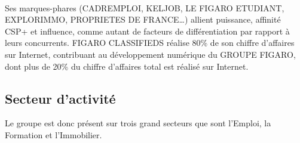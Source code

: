 \paragraph{}
Ses marques-phares (CADREMPLOI, KELJOB, LE FIGARO ETUDIANT, EXPLORIMMO, PROPRIETES DE FRANCE…) allient puissance, affinité CSP+ et influence, comme autant de facteurs de différentiation par rapport à leurs concurrents.
FIGARO CLASSIFIEDS réalise 80\% de son chiffre d’affaires sur Internet, contribuant au développement numérique du GROUPE FIGARO, dont plus de 20\% du chiffre d’affaires total est réalisé sur Internet.

\subsection{Secteur d'activité}
Le groupe est donc présent sur trois grand secteurs que sont l’Emploi, la Formation et l’Immobilier.
